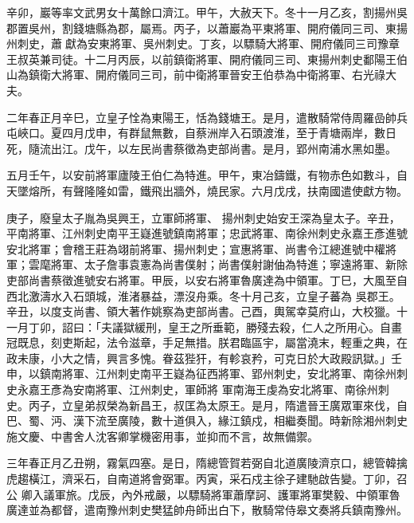 \begin{pinyinscope}
 辛卯，巖等率文武男女十萬餘口濟江。甲午，大赦天下。冬十一月乙亥，割揚州吳郡置吳州，割錢塘縣為郡，屬焉。丙子，以蕭巖為平東將軍、開府儀同三司、東揚州刺史，蕭獻為安東將軍、吳州刺史。丁亥，以驃騎大將軍、開府儀同三司豫章王叔英兼司徒。十二月丙辰，以前鎮衛將軍、開府儀同三司、東揚州刺史鄱陽王伯山為鎮衛大將軍、開府儀同三司，前中衛將軍晉安王伯恭為中衛將軍、右光祿大夫。



 二年春正月辛巳，立皇子恮為東陽王，恬為錢塘王。是月，遣散騎常侍周羅嵒帥兵屯峽口。夏四月戊申，有群鼠無數，自蔡洲岸入石頭渡淮，至于青塘兩岸，數日死，隨流出江。戊午，以左民尚書蔡徵為吏部尚書。是月，郢州南浦水黑如墨。



 五月壬午，以安前將軍廬陵王伯仁為特進。甲午，東冶鑄鐵，有物赤色如數斗，自天墜熔所，有聲隆隆如雷，鐵飛出牆外，燒民家。六月戊戌，扶南國遣使獻方物。



 庚子，廢皇太子胤為吳興王，立軍師將軍、
 揚州刺史始安王深為皇太子。辛丑，平南將軍、江州刺史南平王嶷進號鎮南將軍；忠武將軍、南徐州刺史永嘉王彥進號安北將軍；會稽王莊為翊前將軍、揚州刺史；宣惠將軍、尚書令江總進號中權將軍；雲麾將軍、太子詹事袁憲為尚書僕射；尚書僕射謝伷為特進；寧遠將軍、新除吏部尚書蔡徵進號安右將軍。甲辰，以安右將軍魯廣達為中領軍。丁巳，大風至自西北激濤水入石頭城，淮渚暴益，漂沒舟乘。冬十月己亥，立皇子蕃為
 吳郡王。辛丑，以度支尚書、領大著作姚察為吏部尚書。己酉，輿駕幸莫府山，大校獵。十一月丁卯，詔曰：「夫議獄緩刑，皇王之所垂範，勝殘去殺，仁人之所用心。自畫冠既息，刻吏斯起，法令滋章，手足無措。朕君臨區宇，屬當澆末，輕重之典，在政未康，小大之情，興言多愧。眷茲狴犴，有軫哀矜，可克日於大政殿訊獄。」壬申，以鎮南將軍、江州刺史南平王嶷為征西將軍、郢州刺史，安北將軍、南徐州刺史永嘉王彥為安南將軍、江州刺史，軍師將
 軍南海王虔為安北將軍、南徐州刺史。丙子，立皇弟叔榮為新昌王，叔匡為太原王。是月，隋遣晉王廣眾軍來伐，自巴、蜀、沔、漢下流至廣陵，數十道俱入，緣江鎮戍，相繼奏聞。時新除湘州刺史施文慶、中書舍人沈客卿掌機密用事，並抑而不言，故無備禦。



 三年春正月乙丑朔，霧氣四塞。是日，隋總管賀若弼自北道廣陵濟京口，總管韓擒虎趨橫江，濟采石，自南道將會弼軍。丙寅，采石戍主徐子建馳啟告變。丁卯，召公
 卿入議軍旅。戊辰，內外戒嚴，以驃騎將軍蕭摩訶、護軍將軍樊毅、中領軍魯廣達並為都督，遣南豫州刺史樊猛帥舟師出白下，散騎常侍皋文奏將兵鎮南豫州。




\end{pinyinscope}
